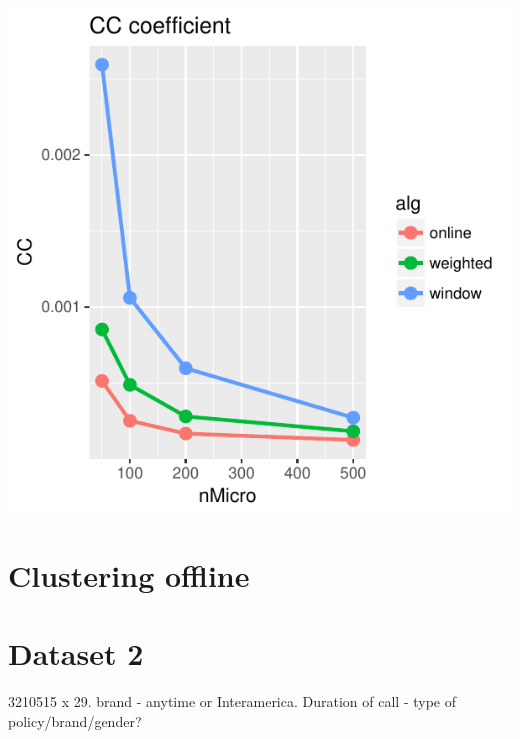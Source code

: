 \includegraphics{offline_regression_files/figure-latex/unnamed-chunk-8-5.pdf}



\section{Clustering offline}

\section{Dataset 2}

3210515 x 29. brand - anytime or Interamerica. 
Duration of call - type of policy/brand/gender?


